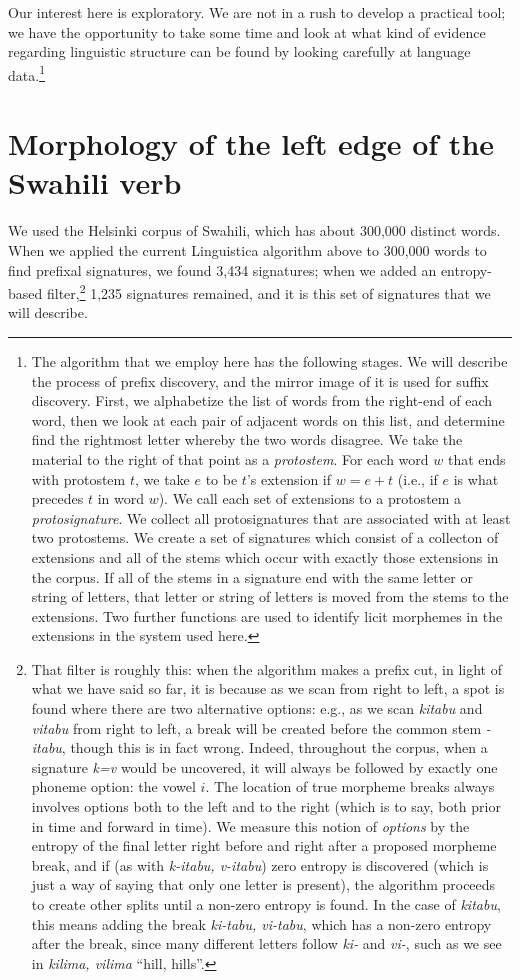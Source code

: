 \documentclass[output=paper,colorlinks,citecolor=brown,
]{langscibook}
\begin{document}
Our interest here is exploratory. We are not in a rush to develop a practical tool; we have the opportunity to take some time and look at what kind of evidence regarding linguistic structure can be found by looking carefully at language data.\footnote{The algorithm that we employ here has the following stages. We will describe the process of prefix discovery, and the mirror image of it is used for suffix discovery. First, we alphabetize the list of words from the right-end of each word, then we look at each pair of adjacent words on this list, and determine find the rightmost letter whereby the two words disagree. We take the material to the right of that point as a \textit{protostem}. For each word $w$ that ends with protostem $t$, we take $e$ to be $t$'s extension if $w=e+t$ (i.e., if $e$ is what precedes $t$ in word $w$). We call each set of extensions to a protostem a \textit{protosignature}. We collect all protosignatures that are associated with at least two protostems. We create a set of signatures which consist of a collecton of extensions and all of the stems which occur with exactly those extensions in the corpus. If all of the stems in a signature end with the same letter or string of letters, that letter or string of letters is moved from the stems to the extensions. Two further functions are used to identify licit morphemes in the extensions in the system used here.}


\section{Morphology of the left edge of the Swahili verb}

We used the Helsinki corpus of Swahili, which has about 300,000 distinct words. When we applied the current Linguistica algorithm above to 300,000 words to find prefixal signatures, we found 3,434 signatures; when we added an entropy-based filter,\footnote{That filter is roughly this: when the algorithm makes a prefix cut, in light of what we have said so far, it is because as we scan from right to left, a spot is found where there are two alternative options: e.g., as we scan \textit{kitabu} and \textit{vitabu} from right to left, a break will be created before {the common stem \textit{-itabu}, though this is in fact wrong. Indeed, throughout the corpus, when a signature \textit{k=v} would be uncovered, it will always be followed by exactly one phoneme option: the vowel $i$. The location of true morpheme breaks always involves options both to the left and to the right (which is to say, both prior in time and forward in time). We measure this notion of \textit{options} by the entropy of the final letter right before and right after a proposed morpheme break, and if (as with \textit{k-itabu, v-itabu}) zero entropy is discovered (which is just a way of saying that only one letter is present), the algorithm proceeds to create other splits until a non-zero entropy is found. In the case of \textit{kitabu}, this means adding the break \textit{ki-tabu, vi-tabu}, which has a non-zero entropy after the break, since many different letters follow \textit{ki-} and \textit{vi-}, such as we see in \textit{kilima, vilima} ``hill, hills''.}}  1,235 signatures remained, and it is this set of signatures that we will describe.  
\end{document}
